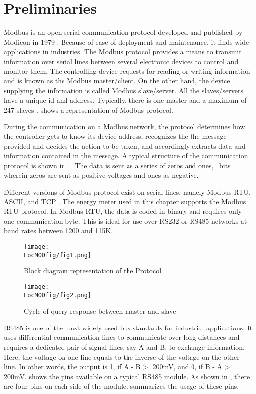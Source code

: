 \section{Preliminaries}
Modbus is an open serial communication protocol developed and
published by Modicon in 1979 \cite{modbus} \cite{modbus-paper}. Because of ease of deployment and maintenance, it finds wide applications in industries. The Modbus protocol provides a means to transmit information over serial lines
between several electronic devices to control and monitor
them. The controlling device requests for reading or writing
information and is known as the Modbus master/client. On the other
hand, the device supplying the information is called
Modbus slave/server. All the slaves/servers have a unique id and
address. Typically, there is one master and a maximum of 247 slaves \cite{simplymodbus}.  shows a representation of Modbus protocol.

During the communication on a Modbus network, the protocol determines
how the controller gets to know its device address, recognizes the
the message provided and decides the action to be taken, and accordingly
extracts data and information contained in the message. A typical structure of the communication protocol is shown in .  The data is
sent as a series of zeros and ones, \ie\ bits wherein zeros are sent
as positive voltages and ones as negative.

Different versions of Modbus protocol exist on serial lines, namely
Modbus RTU, ASCII, and TCP \cite{simplymodbus}.
The energy meter used in this chapter
supports the Modbus RTU protocol. In Modbus RTU, the data is coded in
binary and requires only one communication byte. This is ideal for use
over RS232 or RS485 networks at baud rates between 1200 and 115K.

\begin{figure}
  \centering
  \texttt{[image: \\LocMODfig/fig1.png]}
  \caption{Block diagram representation of the Protocol}
  \label{mod-block}
\end{figure}


\begin{figure}
  \centering
  \texttt{[image: \\LocMODfig/fig2.png]}
  \caption{Cycle of query-response between master and slave}
  \label{mod-master-slave}
\end{figure}

RS485 is one of the most widely used bus standards for industrial
applications. It uses differential communication lines to communicate
over long distances and requires a dedicated pair of signal lines, say
A and B, to exchange information. Here, the voltage on one line equals
to the inverse of the voltage on the other line. In other words, the
output is 1, if A - B \textgreater $\;$ 200mV, and 0, if B - A \textgreater $\;$
200mV.  shows the pins available on a typical RS485 module. As shown in , there are four pins on each side of the module.  summarizes the usage of these pins.

